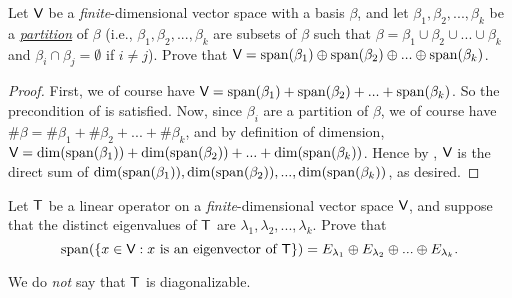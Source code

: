 \begin{exercise} \label{exercise 5.2.22}
Let \(\textsf{V}\) be a \emph{finite}-dimensional vector space with a basis \(\beta\), and let \(\beta_1, \beta_2, ..., \beta_k\) be a \href{https://www.wikiwand.com/en/Partition_of_a_set}{\emph{partition}} of \(\beta\)
(i.e., \(\beta_1, \beta_2, ..., \beta_k\) are subsets of \(\beta\) such that \(\beta = \beta_1 \cup \beta_2 \cup ... \cup \beta_k\) and \(\beta_i \cap \beta_j = \emptyset\) if \(i \ne j\)).
Prove that \(\textsf{V} = \operatorname{span}(\beta_1) \oplus \operatorname{span}(\beta_2) \oplus ... \oplus \operatorname{span}(\beta_k)\).
\end{exercise}

\begin{proof}
First, we of course have \(\textsf{V} = \operatorname{span}(\beta_1) + \operatorname{span}(\beta_2) + ... + \operatorname{span}(\beta_k)\).
So the precondition of  is satisfied.
Now, since \(\beta_i\) are a partition of \(\beta\), we of course have \(\#\beta = \#\beta_1 + \#\beta_2 + ... + \#\beta_k\), and by definition of dimension, \(\textsf{V} = \dim(\operatorname{span}(\beta_1)) + \dim(\operatorname{span}(\beta_2)) + ... + \dim(\operatorname{span}(\beta_k))\).
Hence by , \(\textsf{V}\) is the direct sum of \(\dim(\operatorname{span}(\beta_1)), \dim(\operatorname{span}(\beta_2)), ..., \dim(\operatorname{span}(\beta_k))\), as desired.
\end{proof}

\begin{exercise} \label{exercise 5.2.23}
Let \(\textsf{T}\) be a linear operator on a \emph{finite}-dimensional vector space \(\textsf{V}\), and suppose that the distinct eigenvalues of \(\textsf{T}\) are \(\lambda_1, \lambda_2, ..., \lambda_k\).
Prove that
\[
    \operatorname{span}(\{ x \in \textsf{V}: x \text{ is an eigenvector of } \textsf{T} \}) = E_{\lambda_1} \oplus E_{\lambda_2} \oplus ... \oplus E_{\lambda_k}.
\]
\end{exercise}

\begin{note}
We do \emph{not} say that \(\textsf{T}\) is diagonalizable.
\end{note}

